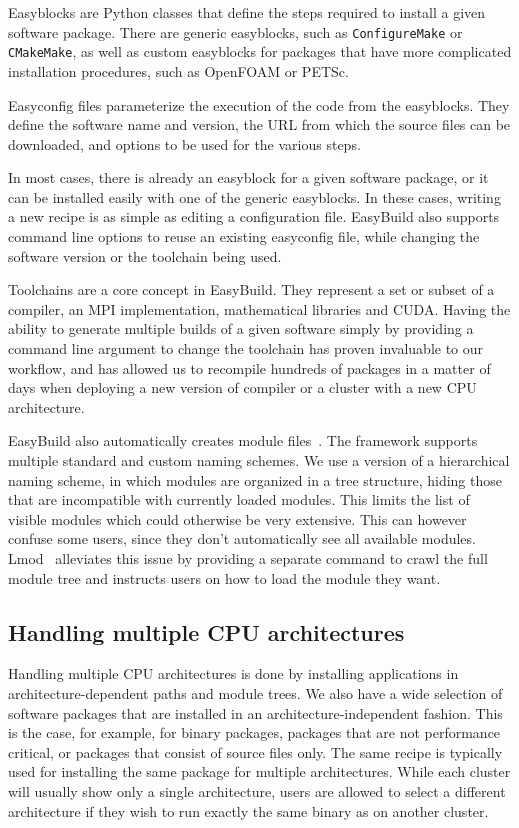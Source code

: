 \documentclass[sigconf]{acmart}
\begin{document}
Easyblocks are Python classes that define the steps required to install a given software package. There are generic easyblocks, such as \texttt{ConfigureMake} or \texttt{CMakeMake}, as well as custom easyblocks for packages that have more complicated installation procedures, such as OpenFOAM or PETSc. 

Easyconfig files parameterize the execution of the code from the easyblocks. They define the software name and version, the URL from which the source files can be downloaded, and options to be used for the various steps. 

In most cases, there is already an easyblock for a given software package, or it can be installed easily with one of the generic easyblocks. In these cases, writing a new recipe is as simple as editing a configuration file. EasyBuild also supports command line options to reuse an existing easyconfig file, while changing the software version or the toolchain being used. 

Toolchains are a core concept in EasyBuild. They represent a set or subset of a compiler, an MPI implementation, mathematical libraries and CUDA. Having the ability to generate multiple builds of a given software simply by providing a command line argument to change the toolchain has proven invaluable to our workflow, and has allowed us to recompile hundreds of packages in a matter of days when deploying a new version of compiler or a cluster with a new CPU architecture. 

EasyBuild also automatically creates module files~\cite{Modules1991,Modules1996,Lmod}. The framework supports multiple standard and custom naming schemes. We use a version of a hierarchical naming scheme, in which modules are organized in a tree structure, hiding those that are incompatible with currently loaded modules. This limits the list of visible modules which could otherwise be very extensive. This can however confuse some users, since they don’t automatically see all available modules. Lmod~\cite{Lmod} alleviates this issue by providing a separate command to crawl the full module tree and instructs users on how to load the module they want.

\subsection{Handling multiple CPU architectures}
\label{sub:Handling_multiple_CPU_architectures}
Handling multiple CPU architectures is done by installing applications in architecture-dependent paths and module trees. We also have a wide selection of software packages that are installed in an architecture-independent fashion. This is the case, for example, for binary packages, packages that are not performance critical, or packages that consist of source files only. The same recipe is typically used for installing the same package for multiple architectures. While each cluster will usually show only a single architecture, users are allowed to select a different architecture if they wish to run exactly the same binary as on another cluster.
\end{document}
